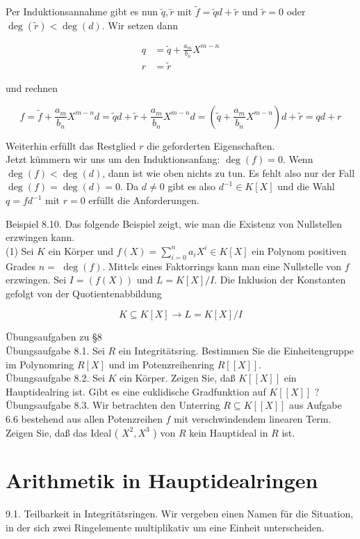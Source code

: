 \documentclass[10pt, letterpaper]{article}
\begin{document}
Per Induktionsannahme gibt es nun $\tilde{q}, \tilde{r}$ mit $\tilde{f}=\tilde{q} d+\tilde{r}$ und $\tilde{r}=0$ oder $\operatorname{deg}(\tilde{r})<\operatorname{deg}(d)$. Wir setzen dann

$$
\begin{aligned}
q & =\tilde{q}+\frac{a_{m}}{b_{n}} X^{m-n} \\
r & =\tilde{r}
\end{aligned}
$$

und rechnen

$$
f=\tilde{f}+\frac{a_{m}}{b_{n}} X^{m-n} d=\tilde{q} d+\tilde{r}+\frac{a_{m}}{b_{n}} X^{m-n} d=\left(\tilde{q}+\frac{a_{m}}{b_{n}} X^{m-n}\right) d+\tilde{r}=q d+r
$$

Weiterhin erfüllt das Restglied $r$ die geforderten Eigenschaften.\\
Jetzt kümmern wir uns um den Induktionsanfang: $\operatorname{deg}(f)=0$. Wenn $\operatorname{deg}(f)<\operatorname{deg}(d)$, dann ist wie oben nichts zu tun. Es fehlt also nur der Fall $\operatorname{deg}(f)=\operatorname{deg}(d)=0$. Da $d \neq 0$ gibt es also $d^{-1} \in K[X]$ und die Wahl $q=f d^{-1}$ mit $r=0$ erfüllt die Anforderungen.

Beispiel 8.10. Das folgende Beispiel zeigt, wie man die Existenz von Nullstellen erzwingen kann.\\
(1) Sei $K$ ein Körper und $f(X)=\sum_{i=0}^{n} a_{i} X^{i} \in K[X]$ ein Polynom positiven Grades $n=$ $\operatorname{deg}(f)$. Mittels eines Faktorrings kann man eine Nullstelle von $f$ erzwingen. Sei $I=(f(X))$ und $L=K[X] / I$. Die Inklusion der Konstanten gefolgt von der Quotientenabbildung

$$
K \subseteq K[X] \rightarrow L=K[X] / I
$$

Übungsaufgaben zu §8\\
Übungsaufgabe 8.1. Sei $R$ ein Integritätsring. Bestimmen Sie die Einheitengruppe im Polynomring $R[X]$ und im Potenzreihenring $R[[X]]$.\\
Übungsaufgabe 8.2. Sei $K$ ein Körper. Zeigen Sie, daß $K[[X]]$ ein Hauptidealring ist. Gibt es eine euklidische Gradfunktion auf $K[[X]]$ ?\\
Übungsaufgabe 8.3. Wir betrachten den Unterring $R \subseteq K[[X]]$ aus Aufgabe 6.6 bestehend aus allen Potenzreihen $f$ mit verschwindendem linearen Term. Zeigen Sie, daß das Ideal ( $X^{2}, X^{3}$ ) von $R$ kein Hauptideal in $R$ ist.

\section*{Arithmetik in Hauptidealringen}
9.1. Teilbarkeit in Integritätsringen. Wir vergeben einen Namen für die Situation, in der sich zwei Ringelemente multiplikativ um eine Einheit unterscheiden.
\end{document}
